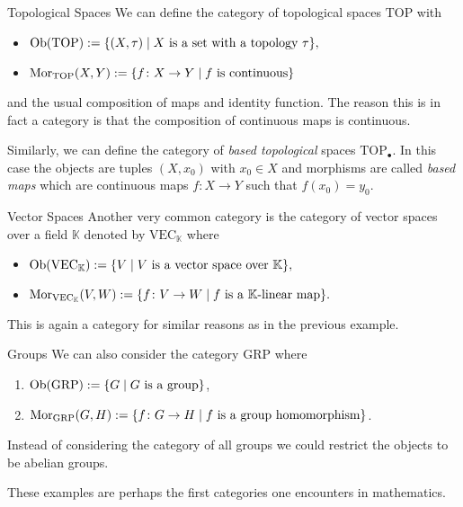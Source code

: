 \begin{example}{Topological Spaces}{}
We can define the category of topological spaces $\mathrm{TOP}$ with
\begin{itemize}
    \item $\mathrm {Ob}(\mathrm{TOP}) := \{(X,\tau) \mid \text{$X$ is a set with a topology $\tau$}\},$
    \item $\mathrm {Mor}_{\mathrm{TOP}}(X,Y) := \{f\colon X \to Y \mid \text{$f$ is continuous}\}$
\end{itemize}
and the usual composition of maps and identity function. The reason this is in fact a category is that the composition of continuous maps is continuous.
\medskip

Similarly, we can define the category of \emph{based topological} spaces $\mathrm{TOP}_\bullet$. In this case the objects are tuples $(X,x_0)$ with $x_0 \in X$ and morphisms are called \emph{based maps} which are continuous maps $f\colon X \to Y$ such that $f(x_0) = y_0$.
\end{example}

\begin{example}{Vector Spaces}{}
Another very common category is the category of vector spaces over a field $\mathbb{K}$ denoted by $\mathrm{VEC}_\mathbb{K}$ where
\begin{itemize}
    \item $\mathrm {Ob}(\mathrm{VEC}_\mathbb{K}) := \{V \mid \text{$V$ is a vector space over $\mathbb{K}$}\},$
    \item $\mathrm {Mor}_{\mathrm{VEC}_\mathbb{K}}(V,W) := \{f\colon V \to W \mid \text{$f$ is a $\mathbb{K}$-linear map}\}.$
\end{itemize}
This is again a category for similar reasons as in the previous example.
\end{example}

\begin{example}{Groups}{}
We can also consider the category $\mathrm{GRP}$ where
\begin{enumerate}
    \item $\mathrm {Ob}(\mathrm{GRP}) := \{G \mid \text{$G$ is a group}\}$,
    \item $\mathrm {Mor}_{\mathrm{GRP}}(G,H) := \{f\colon G \to H \mid \text{$f$ is a group homomorphism}\}$.
\end{enumerate}
Instead of considering the category of all groups we could restrict the objects to be abelian groups.
\end{example}

These examples are perhaps the first categories one encounters in mathematics. 

